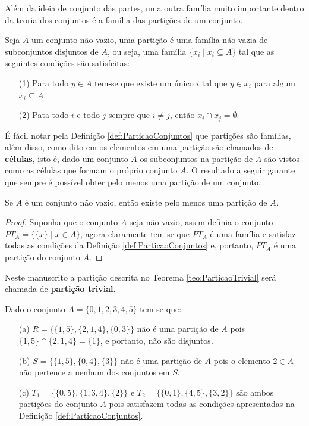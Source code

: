 Além da ideia de conjunto das partes, uma outra família muito importante dentro da teoria dos conjuntos é a família das partições de um conjunto.

\begin{definition}[Partição]\label{def:ParticaoConjuntos}
	Seja $A$ um conjunto não vazio, uma partição é uma família não vazia de subconjuntos disjuntos de $A$, ou seja, uma família $\{x_i \mid x_i \subseteq A\}$ tal que as seguintes condições são satisfeitas:
	\begin{itemize}
		\item[(1)] Para todo $y \in A$ tem-se que existe um único $i$ tal que $y \in x_i$ para algum $x_i \subseteq A$.
		\item[(2)] Pata todo $i$ e todo $j$ sempre que $i \neq j$, então $x_i \cap x_j = \emptyset$.
	\end{itemize}
\end{definition} 

É fácil notar pela Definição   \ref{def:ParticaoConjuntos}  que partições são famílias, além disso, como dito em \cite{lipschutz2013-MD} os elementos em uma partição são chamados de \textbf{células}, isto é, dado um conjunto $A$ os subconjuntos na partição de $A$ são vistos como as células que formam o próprio conjunto $A$. O resultado a seguir garante que sempre é possível obter pelo menos uma partição de um conjunto.

\begin{theorem}\label{teo:ParticaoTrivial}
	Se $A$ é um conjunto não vazio, então existe pelo menos uma partição de $A$.
\end{theorem}

\begin{proof}
	Suponha que o conjunto $A$ seja não vazio, assim definia o conjunto $PT_A = \{\{x\} \mid x \in A\}$, agora claramente tem-se que $PT_A$ é uma família e satisfaz todas as condições da Definição \ref{def:ParticaoConjuntos} e, portanto, $PT_A$ é uma partição do conjunto $A$. 
\end{proof}

\begin{note}
	Neste manuscrito a partição descrita no Teorema \ref{teo:ParticaoTrivial} será chamada de \textbf{partição trivial}. 
\end{note}

\begin{example}
	Dado o conjunto $A = \{0, 1, 2, 3, 4, 5\}$ tem-se que:
	\begin{itemize}
		\item[(a)] $R = \{\{1, 5\}, \{2, 1, 4\}, \{0, 3\}\}$ não é uma partição de $A$ pois $\{1, 5\} \cap \{2, 1, 4\} = \{1\}$, e portanto, não são disjuntos.
		\item[(b)] $S = \{\{1, 5\}, \{0, 4\}, \{3\}\}$ não é uma partição de $A$ pois o elemento $2 \in A$ não pertence a nenhum dos conjuntos em $S$.
		\item[(c)] $T_1 = \{\{0, 5\}, \{1, 3, 4\}, \{2\}\}$ e $T_2 = \{\{0, 1\}, \{4, 5\}, \{3, 2\}\}$ são ambos partições do conjunto $A$ pois satisfazem todas as condições apresentadas na Definição \ref{def:ParticaoConjuntos}.
	\end{itemize}
\end{example}

